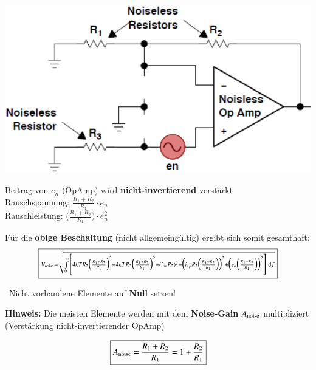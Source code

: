 \begin{minipage}[c]{0.4\columnwidth}
    \includegraphics[width=\columnwidth]{images/rauschen_opamp_en.png}
\end{minipage}
\hfill
\begin{minipage}[c]{0.4\columnwidth}
    Beitrag von $e_n$ (OpAmp) wird \textbf{nicht-invertierend} verstärkt \\

    Rauschspannung: $ \frac{R_1 + R_2}{R_1} \cdot e_n$ \\
    Rauschleistung: $ \bigl(\frac{R_1 + R_2}{R_1} \bigr) \cdot e_n^2$
\end{minipage}

\vspace{0.2cm}
Für die \textbf{obige Beschaltung} (nicht allgemeingültig) ergibt sich somit gesamthaft:
$$ \boxed{ \scriptstyle{  V_{\rm noise} = \sqrt{ \int\limits_{0}^{\infty} \,  \Biggl[
    4 k T R_2 \Bigl( \frac{R_1 + R_2}{R_1} \Bigr)^2 + 4 k T R_3 \Bigl( \frac{R_1 + R_2}{R_1} \Bigr)^2
    + (i_{nn} R_2 )^2 + \Bigl(  i_{np} R_3 \Bigl( \frac{R_1 + R_2}{R_1} \Bigr) \Bigr)^2
    +  \Bigl(  e_n \Bigl( \frac{R_1 + R_2}{R_1} \Bigr) \Bigr)^2
    \Biggr] \, \ensuremath{\mathop{} \! \mathrm{d}}f } }} $$

\textrightarrow\ Nicht vorhandene Elemente auf \textbf{Null} setzen!

\vspace{0.2cm}
\begin{minipage}[c]{0.48\columnwidth}
    \textbf{Hinweis:} Die meisten Elemente werden mit dem \textbf{Noise-Gain} $A_{\rm noise}$ multipliziert 
    (Verstärkung nicht-invertierender OpAmp)
\end{minipage}
\hfill
\begin{minipage}[c]{0.48\columnwidth}
    $$ \boxed{ A_{\rm noise} = \frac{R_1 + R_2}{R_1} = 1 + \frac{R_2}{R_1}}$$
\end{minipage}


